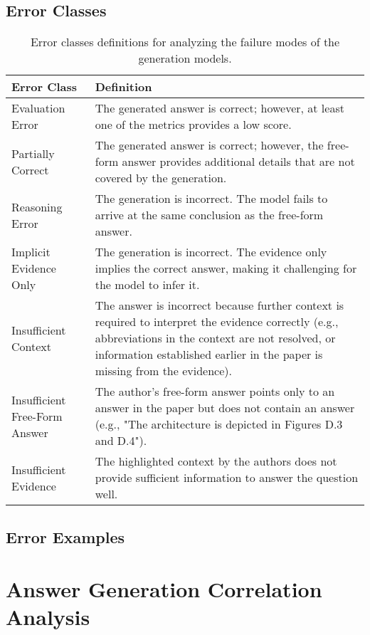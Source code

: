 \subsection{Error Classes}
\begin{table}[!htpb]
\small
\begin{tabularx}{\textwidth}{lX}
\toprule
Error Class & Definition \\
\midrule
Evaluation Error & The generated answer is correct; however, at least one of the metrics provides a low score. \\
Partially Correct & The generated answer is correct; however, the free-form answer provides additional details that are not covered by the generation. \\
Reasoning Error & The generation is incorrect. The model fails to arrive at the same conclusion as the free-form answer. \\
Implicit Evidence Only & The generation is incorrect. The evidence only implies the correct answer, making it challenging for the model to infer it. \\
Insufficient Context & The answer is incorrect because further context is required to interpret the evidence correctly (e.g., abbreviations in the context are not resolved, or information established earlier in the paper is missing from the evidence).  \\
Insufficient Free-Form Answer & The author's free-form answer points only to an answer in the paper but does not contain an answer (e.g., "The architecture is depicted in Figures D.3 and D.4").\\
Insufficient Evidence & The highlighted context by the authors does not provide sufficient information to answer the question well. \\
\bottomrule
\end{tabularx}
\caption{Error classes definitions for analyzing the failure modes of the generation models.}
\label{tbl:appendix-error-class-definition}
\end{table}

\clearpage
\subsection{Error Examples}


\clearpage
\section{Answer Generation Correlation Analysis}
